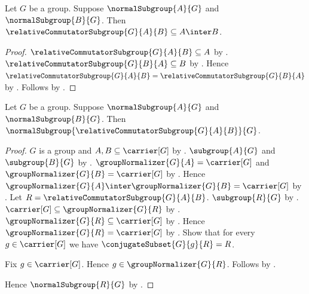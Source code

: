 \begin{theorem}\label{normal_subgroups_relative_commutator_intersection}
    Let $G$ be a group.
    Suppose $\normalSubgroup{A}{G}$ and
        $\normalSubgroup{B}{G}$.
    Then
        $\relativeCommutatorSubgroup{G}{A}{B}\subseteq A\inter B$.
\end{theorem}
\begin{proof}
    $\relativeCommutatorSubgroup{G}{A}{B}\subseteq A$ by
        .
    $\relativeCommutatorSubgroup{G}{B}{A}\subseteq B$ by
        .
    Hence
        $\relativeCommutatorSubgroup{G}{A}{B}=
            \relativeCommutatorSubgroup{G}{B}{A}$ by
        .
    Follows by .
\end{proof}

\begin{theorem}\label{normal_subgroups_relative_commutator_normal}
    Let $G$ be a group.
    Suppose $\normalSubgroup{A}{G}$ and
        $\normalSubgroup{B}{G}$.
    Then
        $\normalSubgroup{
            \relativeCommutatorSubgroup{G}{A}{B}}{G}$.
\end{theorem}
\begin{proof}
    $G$ is a group and $A,B\subseteq\carrier[G]$ by
        .
    $\subgroup{A}{G}$ and $\subgroup{B}{G}$ by
        .
    $\groupNormalizer{G}{A}=\carrier[G]$ and
        $\groupNormalizer{G}{B}=\carrier[G]$ by
        .
    Hence
        $\groupNormalizer{G}{A}\inter\groupNormalizer{G}{B}
            =\carrier[G]$ by .
    Let $R=\relativeCommutatorSubgroup{G}{A}{B}$.
    $\subgroup{R}{G}$ by
        .
    $\carrier[G]\subseteq\groupNormalizer{G}{R}$ by
        .
    $\groupNormalizer{G}{R}\subseteq\carrier[G]$ by
        .
    Hence $\groupNormalizer{G}{R}=\carrier[G]$ by
        .
    Show that for every $g\in\carrier[G]$ we have
        $\conjugateSubset{G}{g}{R}=R$.
    \begin{subproof}
        Fix $g\in\carrier[G]$.
        Hence $g\in\groupNormalizer{G}{R}$.
        Follows by .
    \end{subproof}
    Hence $\normalSubgroup{R}{G}$ by .
\end{proof}

